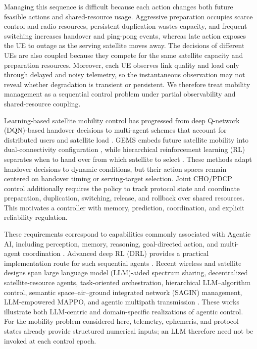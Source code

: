 \documentclass[journal]{IEEEtran}
\begin{document}
Managing this sequence is difficult because each action changes both future
feasible actions and shared-resource usage. Aggressive preparation occupies
scarce control and radio resources, persistent duplication wastes capacity,
and frequent switching increases handover and ping-pong events, whereas late
action exposes the UE to outage as the serving satellite moves away. The
decisions of different UEs are also coupled because they compete for the same
satellite capacity and preparation resources. Moreover, each UE observes link
quality and load only through delayed and noisy telemetry, so the instantaneous
observation may not reveal whether degradation is transient or persistent.
We therefore treat mobility management as a sequential control problem under
partial observability and shared-resource coupling.

Learning-based satellite mobility control has progressed from deep Q-network
(DQN)-based handover decisions \cite{yang2023dqn} to multi-agent schemes that
account for distributed users and satellite load
\cite{liu2024marlho,yang2024fingerprints}. GEMS embeds future satellite
mobility into dual-connectivity configuration \cite{wang2026gems}, while
hierarchical reinforcement learning (RL) separates when to hand over from
which satellite to select \cite{zhao2026hrl}. These methods adapt handover
decisions to dynamic conditions, but their action spaces remain centered on
handover timing or serving-target selection. Joint CHO/PDCP control
additionally requires the policy to track protocol state and coordinate
preparation, duplication, switching, release, and rollback over shared
resources. This motivates a controller with memory, prediction, coordination,
and explicit reliability regulation.

These requirements correspond to capabilities commonly associated with
Agentic AI, including perception, memory, reasoning, goal-directed action,
and multi-agent coordination
\cite{sapkota2026agentic,jiang2026tutorial,zhang2026edgeagentic}.
Advanced deep RL (DRL) provides a practical implementation route for such
sequential agents \cite{zheng2026agenticdrl}. Recent wireless and satellite
designs span large language model (LLM)-aided spectrum sharing, decentralized satellite-resource
agents, task-oriented orchestration, hierarchical LLM--algorithm control,
semantic space--air--ground integrated network (SAGIN) management,
LLM-empowered MAPPO, and agentic multipath transmission
\cite{ni2026llmleo,shen2026aers,xie2026agenticiov,cao2026thinkdo,zhang2026saginagentic,hu2026llmmappo,zhang2026agenticmultipath}.
These works illustrate both LLM-centric and domain-specific realizations of
agentic control. For the mobility
problem considered here, telemetry, ephemeris, and protocol states already
provide structured numerical inputs; an LLM therefore need not be invoked at
each control epoch.
\end{document}
